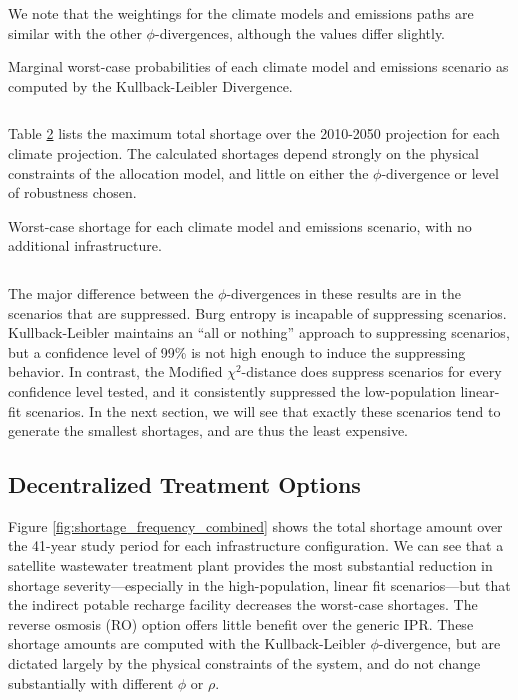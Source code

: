 \documentclass[opre,nonblindrev]{informs3} %
\begin{document}
We note that the weightings for the climate models and emissions paths are similar with the other $\phi$-divergences, although the values differ slightly.

\begin{table}
	\TABLE
	{
		Marginal worst-case probabilities of each climate model and emissions scenario as computed by the Kullback-Leibler Divergence.
		\label{tb:pworst_model_emission_kl}
	}
	{\begin{tabular}{l|cccc|c}
		
	 \end{tabular}}
	{}
\end{table}

Table \ref{tb:shortage_model_emission_kl} lists the maximum total shortage over the 2010-2050 projection for each climate projection.
The calculated shortages depend strongly on the physical constraints of the allocation model, and little on either the $\phi$-divergence or level of robustness chosen.

\begin{table}
	\TABLE
	{
		Worst-case shortage for each climate model and emissions scenario, with no additional infrastructure.
		\label{tb:shortage_model_emission_kl}
	}
	{\begin{tabular}{l|cccc|c}
		
	 \end{tabular}}
	{}
\end{table}

The major difference between the $\phi$-divergences in these results are in the scenarios that are suppressed.
Burg entropy is incapable of suppressing scenarios.
Kullback-Leibler maintains an ``all or nothing'' approach to suppressing scenarios, but a confidence level of 99\% is not high enough to induce the suppressing behavior.
In contrast, the Modified $\chi^2$-distance does suppress scenarios for every confidence level tested, and it consistently suppressed the low-population linear-fit scenarios.
In the next section, we will see that exactly these scenarios tend to generate the smallest shortages, and are thus the least expensive.


\subsection{Decentralized Treatment Options}

Figure \ref{fig:shortage_frequency_combined} shows the total shortage amount over the 41-year study period for each infrastructure configuration.
We can see that a satellite wastewater treatment plant provides the most substantial reduction in shortage severity---especially in the high-population, linear fit scenarios---but that the indirect potable recharge facility decreases the worst-case shortages.
The reverse osmosis (RO) option offers little benefit over the generic IPR.
These shortage amounts are computed with the Kullback-Leibler $\phi$-divergence, but are dictated largely by the physical constraints of the system, and do not change substantially with different $\phi$ or $\rho$.
\end{document}
